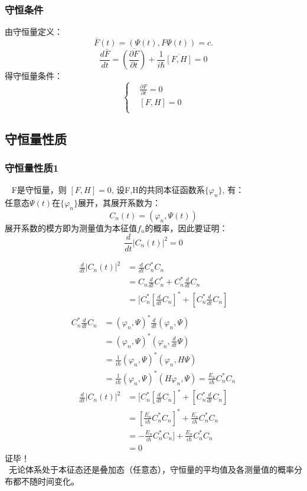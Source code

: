 \begin{frame} 
        \frametitle{守恒条件} 
        由守恒量定义：   
        $$ \bar{F}(t)=(\Psi(t), F\Psi(t)) =c.  $$
        $$\frac{d\bar{F}}{dt}=\overline{(\frac{\partial F }{\partial t})}  +\frac{1}{i\hbar} \overline{[F,H]}=0$$
        得守恒量条件：
        $$\left\{\begin{aligned}
            &\frac{\partial F }{\partial t}=0\\
            &[F,H]=0 \\
        \end{aligned} \right. $$
\end{frame}

\subsection{守恒量性质}

\begin{frame} 
    \frametitle{守恒量性质1} 
    \例[20.试证明守恒量测量值的概率分布不随时间改变]{}
    \证~ F是守恒量，则 $[F,H]=0$, 设F,H的共同本征函数系$\{\varphi_n\}$, 有：\\ 
    任意态$\Psi(t)$在$\{\varphi_n\}$展开，其展开系数为：
    $$C_n(t)=(\varphi_n, \Psi(t))$$
    展开系数的模方即为测量值为本征值$f_n$的概率，因此要证明：
    $$\frac{d}{dt} |C_n(t)|^2=0$$
\end{frame}

\begin{frame} [allowframebreaks=]
    $$\begin{aligned}
      \frac{d}{dt} |C_n(t)|^2 &= \frac{d}{dt} C_n^* C_n \\
      &=C_n \frac{d}{dt} C_n^*  +  C_n^*\frac{d}{dt}C_n \\
      &=[C_n^*[\frac{d}{dt} C_n]^*  +  [C_n^*\frac{d}{dt}C_n] \\
    \end{aligned}$$
    $$\begin{aligned}
      C_n^*\frac{d}{dt}C_n&= (\varphi_n, \Psi)^* \frac{d}{dt}(\varphi_n, \Psi) \\
      &= (\varphi_n, \Psi)^* (\varphi_n, \frac{d}{dt}\Psi) \\
      &= \frac{1}{i\hbar}(\varphi_n, \Psi)^* (\varphi_n, H\Psi) \\
      &= \frac{1}{i\hbar}(\varphi_n, \Psi)^* (H\varphi_n, \Psi) = \frac{E_n}{i\hbar}C_n ^* C_n 
    \end{aligned}$$
    $$\begin{aligned}
        \frac{d}{dt} |C_n(t)|^2 &= [C_n^*[\frac{d}{dt} C_n]^*  +  [C_n^*\frac{d}{dt}C_n] \\
        &= [\frac{E_n}{i\hbar}C_n ^* C_n ]^* + \frac{E_n}{i\hbar}C_n ^* C_n \\
        &= -\frac{E_n}{i\hbar}C_n ^* C_n ] + \frac{E_n}{i\hbar}C_n ^* C_n \\
        &=0
    \end{aligned}$$
      证毕！ \\
    \Tips ~无论体系处于本征态还是叠加态（任意态），守恒量的平均值及各测量值的概率分布都不随时间变化。         
\end{frame}

